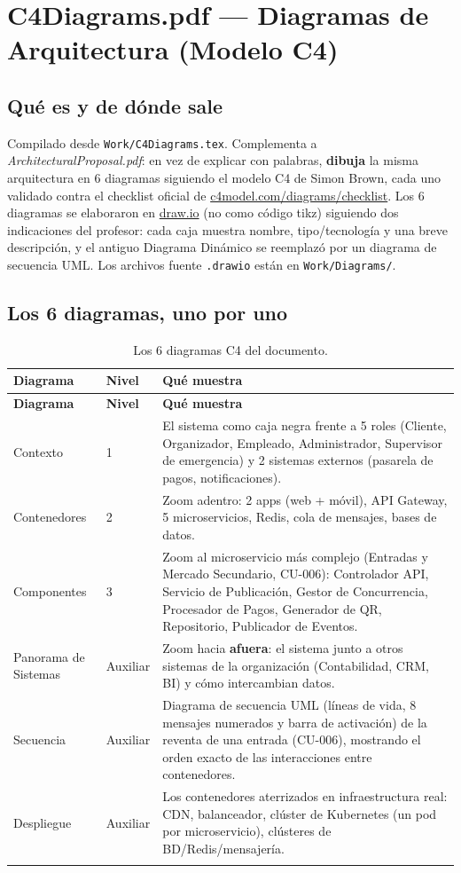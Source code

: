 \documentclass[12pt,a4paper]{article}
\begin{document}
\section{C4Diagrams.pdf --- Diagramas de Arquitectura (Modelo C4)}

\subsection{Qué es y de dónde sale}

Compilado desde \texttt{Work/C4Diagrams.tex}. Complementa a \textit{ArchitecturalProposal.pdf}: en
vez de explicar con palabras, \textbf{dibuja} la misma arquitectura en 6 diagramas siguiendo el
modelo C4 de Simon Brown, cada uno validado contra el checklist oficial de
\href{https://c4model.com/diagrams/checklist}{c4model.com/diagrams/checklist}. Los 6 diagramas se
elaboraron en \href{https://app.diagrams.net/}{draw.io} (no como código tikz) siguiendo dos
indicaciones del profesor: cada caja muestra nombre, tipo/tecnología y una breve descripción, y el
antiguo Diagrama Dinámico se reemplazó por un diagrama de secuencia UML. Los archivos fuente
\texttt{.drawio} están en \texttt{Work/Diagrams/}.

\subsection{Los 6 diagramas, uno por uno}

\begin{longtable}{p{2.6cm}p{2.1cm}p{7.9cm}}
\toprule
\textbf{Diagrama} & \textbf{Nivel} & \textbf{Qué muestra}\\
\midrule
\endfirsthead
\toprule
\textbf{Diagrama} & \textbf{Nivel} & \textbf{Qué muestra}\\
\midrule
\endhead
Contexto & 1 & El sistema como caja negra frente a 5 roles (Cliente, Organizador, Empleado,
Administrador, Supervisor de emergencia) y 2 sistemas externos (pasarela de pagos, notificaciones).\\[0.4em]
Contenedores & 2 & Zoom adentro: 2 apps (web + móvil), API Gateway, 5 microservicios, Redis, cola de
mensajes, bases de datos.\\[0.4em]
Componentes & 3 & Zoom al microservicio más complejo (Entradas y Mercado Secundario, CU-006):
Controlador API, Servicio de Publicación, Gestor de Concurrencia, Procesador de Pagos, Generador de
QR, Repositorio, Publicador de Eventos.\\[0.4em]
Panorama de Sistemas & Auxiliar & Zoom hacia \textbf{afuera}: el sistema junto a otros sistemas de
la organización (Contabilidad, CRM, BI) y cómo intercambian datos.\\[0.4em]
Secuencia & Auxiliar & Diagrama de secuencia UML (líneas de vida, 8 mensajes numerados y barra de
activación) de la reventa de una entrada (CU-006), mostrando el orden exacto de las interacciones
entre contenedores.\\[0.4em]
Despliegue & Auxiliar & Los contenedores aterrizados en infraestructura real: CDN, balanceador,
clúster de Kubernetes (un pod por microservicio), clústeres de BD/Redis/mensajería.\\
\bottomrule
\caption{Los 6 diagramas C4 del documento.}
\end{longtable}
\end{document}

